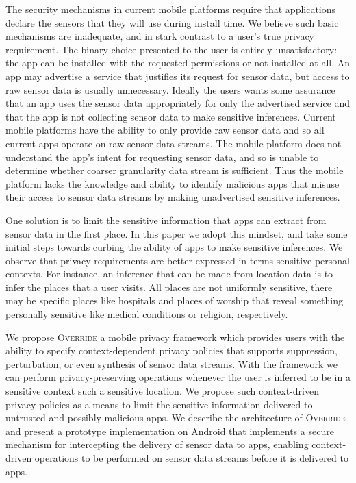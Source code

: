 \documentclass[10pt]{sensys-proc}
\begin{document}
The security mechanisms in current mobile platforms require that applications declare the sensors that they will use during install time. We believe such basic mechanisms are inadequate, and in stark contrast to a user's true privacy requirement. The binary choice presented to the user is entirely unsatisfactory: the app can be installed with the requested permissions or not installed at all. An app may advertise a service that justifies its request for sensor data, but access to raw sensor data is usually unnecessary. Ideally the users wants some assurance that an app uses the sensor data appropriately for only the advertised service and that the app is not collecting sensor data to make sensitive inferences. Current mobile platforms have the ability to only provide raw sensor data and so all current apps operate on raw sensor data streams. The mobile platform does not understand the app's intent for requesting sensor data, and so is unable to determine whether coarser granularity data stream is sufficient. Thus the mobile platform lacks the knowledge and ability to identify malicious apps that misuse their access to sensor data streams by making unadvertised sensitive inferences.

One solution is to limit the sensitive information that apps can extract from sensor data in the first place. In this paper we adopt this mindset, and take some initial steps towards curbing the ability of apps to make sensitive inferences. We observe that privacy requirements are better expressed in terms sensitive personal contexts. For instance, an inference that can be made from location data is to infer the places that a user visits. All places are not uniformly sensitive, there may be specific places like hospitals and places of worship that reveal something personally sensitive like medical conditions or religion, respectively.

We propose \textsc{Override} a mobile privacy framework which provides users with the ability to specify context-dependent privacy policies that supports suppression, perturbation, or even synthesis of sensor data streams. With the framework we can perform privacy-preserving operations whenever the user is inferred to be in a sensitive context such a sensitive location. We propose such context-driven privacy policies as a means to limit the sensitive information delivered to untrusted and possibly malicious apps. We describe the architecture of \textsc{Override} and present a prototype implementation on Android that implements a secure mechanism for intercepting the delivery of sensor data to apps, enabling context-driven operations to be performed on sensor data streams before it is delivered to apps.
\end{document}
